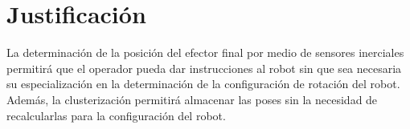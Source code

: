 \section{Justificación}

La determinación de la posición del efector final por medio de sensores inerciales permitirá que el operador pueda dar instrucciones al robot sin que sea necesaria su especialización en la determinación de la configuración de rotación del robot. Además, la clusterización permitirá almacenar las poses sin la necesidad de recalcularlas para la configuración del robot.